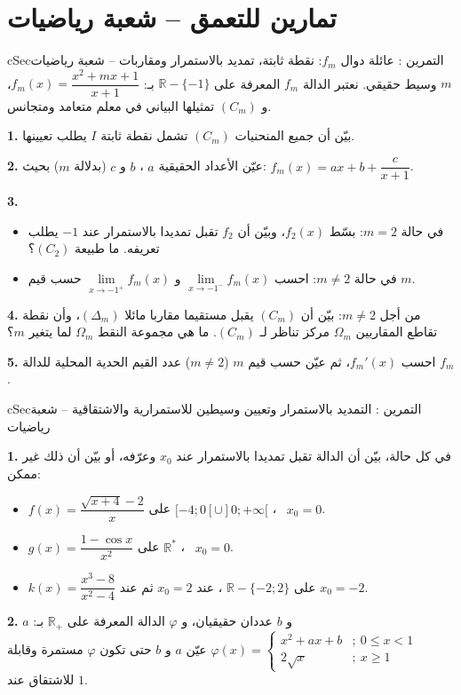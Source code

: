 \documentclass[12pt,a4paper]{article}
\newenvironment{BOX}[2]{\begin{otherlanguage}{english}\begin{arbox}{#1}{#2}}{\end{arbox}\end{otherlanguage}}
\newcounter{exo}
\newenvironment{tamrin}[1]{\stepcounter{exo}\begin{BOX}{cSec}{التمرين \theexo: #1}}{\end{BOX}}
\newcommand{\R}{\mathbb{R}}
\newenvironment{sq}{\begin{itemize}[leftmargin=2.4em,itemsep=3pt]}{\end{itemize}}
\newcommand{\qa}{\item[(أ)]}\newcommand{\qb}{\item[(ب)]}\newcommand{\qc}{\item[(جـ)]}\newcommand{\qd}{\item[(د)]}\newcommand{\qe}{\item[(هـ)]}
\newcommand{\QQ}[1]{\par\smallskip\textbf{#1.} }
\begin{document}
\section{تمارين للتعمق -- شعبة رياضيات}
\begin{tamrin}{عائلة دوال $f_m$: نقطة ثابتة، تمديد بالاستمرار ومقاربات -- شعبة رياضيات}
$m$ وسيط حقيقي. نعتبر الدالة $f_m$ المعرفة على $\R-\{-1\}$ بـ: $f_m(x)=\dfrac{x^{2}+mx+1}{x+1}$، و $(C_m)$ تمثيلها البياني في معلم متعامد ومتجانس.
\QQ{1} بيّن أن جميع المنحنيات $(C_m)$ تشمل نقطة ثابتة $I$ يطلب تعيينها.
\QQ{2} عيّن الأعداد الحقيقية $a$ ، $b$ و $c$ (بدلالة $m$) بحيث: $f_m(x)=ax+b+\dfrac{c}{x+1}$.
\QQ{3}
\begin{sq}
\qa في حالة $m=2$: بسّط $f_2(x)$، وبيّن أن $f_2$ تقبل تمديدا بالاستمرار عند $-1$ يطلب تعريفه. ما طبيعة $(C_2)$؟
\qb في حالة $m\neq2$: احسب $\lim\limits_{x\to-1^{-}}f_m(x)$ و $\lim\limits_{x\to-1^{+}}f_m(x)$ حسب قيم $m$.
\end{sq}
\QQ{4} من أجل $m\neq2$: بيّن أن $(C_m)$ يقبل مستقيما مقاربا مائلا $(\Delta_m)$، وأن نقطة تقاطع المقاربين $\Omega_m$ مركز تناظر لـ $(C_m)$. ما هي مجموعة النقط $\Omega_m$ لما يتغير $m$؟
\QQ{5} احسب $f_m'(x)$، ثم عيّن حسب قيم $m$ ($m\neq2$) عدد القيم الحدية المحلية للدالة $f_m$.
\end{tamrin}

\begin{tamrin}{التمديد بالاستمرار وتعيين وسيطين للاستمرارية والاشتقاقية -- شعبة رياضيات}
\QQ{1} في كل حالة، بيّن أن الدالة تقبل تمديدا بالاستمرار عند $x_0$ وعرّفه، أو بيّن أن ذلك غير ممكن:
\begin{sq}
\qa $f(x)=\dfrac{\sqrt{x+4}-2}{x}$ على $[-4;0[\cup]0;+\infty[$ ، \ $x_0=0$.
\qb $g(x)=\dfrac{1-\cos x}{x^{2}}$ على $\R^{*}$ ، \ $x_0=0$.
\qc $k(x)=\dfrac{x^{3}-8}{x^{2}-4}$ على $\R-\{-2;2\}$ ، عند $x_0=2$ ثم عند $x_0=-2$.
\end{sq}
\QQ{2} $a$ و $b$ عددان حقيقيان، و $\varphi$ الدالة المعرفة على $\R_{+}$ بـ:
\(\varphi(x)=\left\{\begin{array}{ll}x^{2}+ax+b & ;\ 0\le x<1\\ 2\sqrt{x} & ;\ x\ge1\end{array}\right.\)
عيّن $a$ و $b$ حتى تكون $\varphi$ مستمرة وقابلة للاشتقاق عند $1$.
\end{tamrin}
\end{document}
